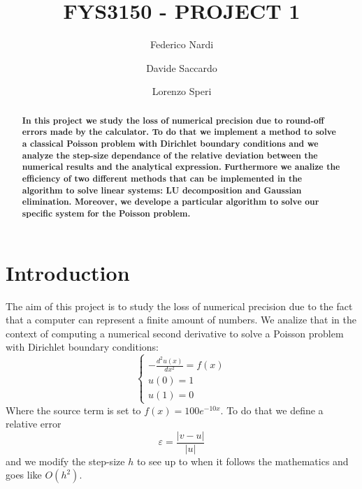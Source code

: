 \documentclass[10pt,showpacs,preprintnumbers,footinbib,amsmath,amssymb,aps,prl,twocolumn,groupedaddress,superscriptaddress,showkeys]{revtex4-1}
\begin{document}
\title{FYS3150 - PROJECT 1}

\author{Federico Nardi}
\author{Davide Saccardo} 
\author{Lorenzo Speri}

\begin{abstract}
	\textbf{	
	In this project we study the loss of numerical precision due to round-off errors made by the calculator. To do that we implement a method to solve a classical Poisson problem with Dirichlet boundary conditions and we analyze the step-size dependance of the relative deviation between the numerical results and the analytical expression.
	Furthermore we analize the efficiency of two different methods that can be implemented in the algorithm to solve linear systems: LU decomposition and Gaussian elimination. Moreover, we develope a particular algorithm to solve our specific system for the Poisson problem.}
\end{abstract}



\maketitle



\section{Introduction}
The aim of this project is to study the loss of numerical precision due to the fact that a computer can represent a finite amount of numbers. We analize that in the context of computing a numerical second derivative to solve a Poisson problem with Dirichlet boundary conditions:
\begin{equation}\label{ref:poisson}
\begin{cases}
- \frac{d^2 u(x)}{dx^2} = f(x)\\
u(0) = 1 \\
u(1) = 0 
\end{cases}
\end{equation}
Where the source term is set to $f(x) = 100e^{-10x}$.
To do that we define a relative error
\begin{equation}
\varepsilon = \frac{|v - u|}{|u|}
\end{equation}
and we modify the step-size $h$ to see up to when it follows the mathematics and goes like $O(h^2)$.
\end{document}
